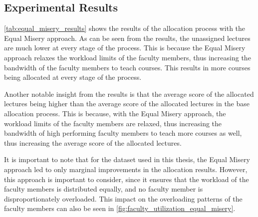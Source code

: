 \subsection{Experimental Results}


\begin{table}[H]
  \centering
  \caption{Experimental Results of Equal Misery}
  \label{tab:equal_misery_results}
\end{table}

\autoref{tab:equal_misery_results} shows the results of the allocation process with the Equal Misery approach. As can be seen from the results, the unassigned lectures are much lower at every stage of the process. This is because the Equal Misery approach relaxes the workload limits of the faculty members, thus increasing the bandwidth of the faculty members to teach courses. This results in more courses being allocated at every stage of the process.

Another notable insight from the results is that the average score of the allocated lectures being higher than the average score of the allocated lectures in the base allocation process. This is because, with the Equal Misery approach, the workload limits of the faculty members are relaxed, thus increasing the bandwidth of high performing faculty members to teach more courses as well, thus increasing the average score of the allocated lectures.

It is important to note that for the dataset used in this thesis, the Equal Misery approach led to only marginal improvements in the allocation results. However, this approach is important to consider, since it ensures that the workload of the faculty members is distributed equally, and no faculty member is disproportionately overloaded. This impact on the overloading patterns of the faculty members can also be seen in \autoref{fig:faculty_utilization_equal_misery}.


